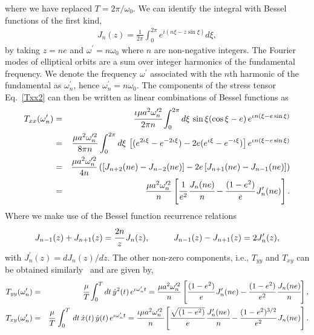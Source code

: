 \documentclass[aps,prd]{revtex4-2}
\begin{document}
where we have replaced $T=2\pi/\omega_0$.
We can identify the integral with Bessel functions of the first kind,
\begin{eqnarray}
J_{n}(z)=\frac{1}{2\pi}\int^{2\pi}_{0} e^{i(n\xi-z\sin\xi)}d\xi,
\end{eqnarray}
by taking  $z= ne$ and $\omega^\prime= n\omega_0$ where  $n$ are non-negative integers. The Fourier modes of elliptical orbits are a sum over integer harmonics of the fundamental frequency. We denote the frequency $\omega^{\prime}$ associated with the $n$th harmonic of the fundamental as $\omega_{n}^{\prime}$, hence $\omega_{n}^{\prime} = n{\omega}_{0}$.
The components of the stress tensor Eq.~\eqref{Txx2} can then be written as linear combinations of Bessel functions as
\begin{eqnarray}\label{Txx3}
T_{xx}({\omega}_{n}^{\prime}) &=& \cfrac{\iota\mu a^{2} \omega_{n}^{\prime 2}}{2 \pi n } \int_{0}^{2\pi} d\xi \,\sin\xi (\cos\xi - e)\, e^{\iota n (\xi - e \sin\xi)} \nonumber\\
&=& \frac{\mu a^2 \omega_n^{\prime 2}}{8\pi n }\int_0^{2\pi} d\xi\,\left[(e^{2 \iota \xi}-e^{-2 \iota \xi})-2e(e^{ \iota \xi}-e^{-\iota \xi})\right]e^{\iota n (\xi - e \sin\xi)}  \nonumber\\
&=& \frac{\mu a^2 \omega_n^{\prime 2}}{4 n }\left( \left[J_{n+2}(ne)-J_{n-2}(ne) \right]-2e\left[J_{n+1}(ne) - J_{n-1}(ne)\right]\right)\nonumber\\
& =& \frac{ \mu a^{2} \omega_{n}^{\prime 2}}{n} \left[ \cfrac{1}{ e^{2}}\,\cfrac{J_{n}(ne)}{n} -\cfrac{(1 - e^{2})}{e}\,J_{n}^{\prime}(ne)  \right].
\end{eqnarray}
Where we make use of the Bessel function recurrence relations
\begin{eqnarray}\label{bessel-recurr}
J_{n-1}(z) + J_{n+1}(z) = \cfrac{2n}{z}\,J_n(z), \hspace{1cm} J_{n-1}(z) - J_{n+1}(z) = 2J^\prime_n(z),
\end{eqnarray}    
with $J^\prime_{n}(z)=dJ_n(z)/dz$.
The other non-zero components, i.e., $T_{yy}$ and $T_{xy}$ can be obtained similarly~\cite{Poddar:2021yjd, Hait:2022ukn} and are given by,
\begin{eqnarray}\label{Tyy-xy}
T_{yy}(\omega_{n}^{\prime}) &=& \cfrac{\mu}{T} \int_{0}^{T} dt\, \dot{y}^{2}(t)\,e^{\iota\omega_{n}^{\prime} t} 
 = \frac{\mu a^{2} \omega_{n}^{\prime 2}}{n}\left[\cfrac{(1 - e^{2})}{e}\, J_{n}^{\prime}(ne) - \cfrac{(1 - e^{2})}{e^{2}}\,\cfrac{J_{n}(ne)}{n} \right], \nonumber\\
T_{xy}(\omega_{n}^{\prime}) &=& \cfrac{\mu}{T}\, \int_{0}^{T}\, dt\, \dot{x}(t)\,\dot{y}(t)\, e^{\iota\omega_{n}^{\prime} t} 
= \cfrac{\iota \mu a^{2} \omega_{n}^{\prime 2}\, }{n}\left[\cfrac{\sqrt{(1 - e^{2})}}{e}\,\cfrac{J_{n}^{\prime}(ne)}{n} -\cfrac{(1-e^{2})^{3/2}}{e^{2}}\,J_{n}(ne)   \right].
\end{eqnarray}
\end{document}
